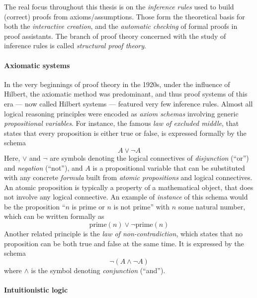 \begin{emphpar}
The real focus throughout this thesis is on the \emph{inference rules} used to
build (correct) proofs from axioms/assumptions. Those form the theoretical basis
for both the \emph{interactive creation}, and the \emph{automatic checking} of
formal proofs in proof assistants. The branch of proof theory concerned with the
study of inference rules is called \emph{structural proof theory}.
\end{emphpar}

\paragraph{Axiomatic systems} 

In the very beginnings of proof theory in the 1920s, under the influence of
Hilbert, the axiomatic method was predominant, and thus proof systems of this
era --- now called Hilbert systems --- featured very few inference rules. Almost
all logical reasoning principles were encoded as \emph{axiom schemas} involving
generic \emph{propositional variables}. For instance, the famous \emph{law of
excluded middle}, that states that every proposition is either true or false, is
expressed formally by the schema
$$A \lor \neg A$$
Here, $\lor$ and $\neg$ are symbols denoting the logical connectives of
\emph{disjunction} (``or'') and \emph{negation} (``not''), and $A$ is a
propositional variable that can be substituted with any concrete \emph{formula}
built from \emph{atomic propositions} and logical connectives. An atomic
proposition is typically a property of a mathematical object, that does not
involve any logical connective. An example of \emph{instance} of this schema
would be the proposition ``$n$ is prime or $n$ is not prime'' with $n$ some
natural number, which can be written formally as
$$\mathrm{prime}(n) \lor \neg\mathrm{prime}(n)$$
Another related principle is the \emph{law of non-contradiction}, which states
that no proposition can be both true and false at the same time. It is expressed
by the schema
$$\neg (A \land \neg A)$$
where $\land$ is the symbol denoting \emph{conjunction} (``and'').

\paragraph{Intuitionistic logic}

